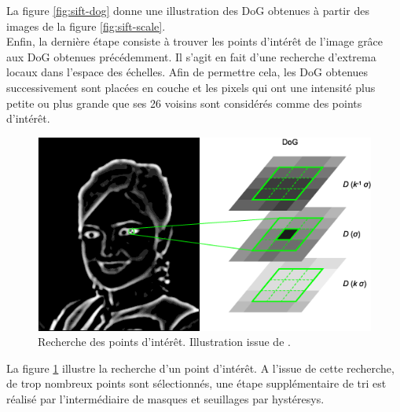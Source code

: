 \documentclass[a4paper, 11pt]{article}
\begin{document}
		La figure \ref{fig:sift-dog} donne une illustration des DoG obtenues à partir des images de la figure \ref{fig:sift-scale}.
		\\Enfin, la dernière étape consiste à trouver les points d'intérêt de l'image grâce aux DoG obtenues précédemment. Il s'agit en fait d'une recherche d'extrema locaux dans l'espace des échelles. Afin de permettre cela, les DoG obtenues successivement sont placées en couche et les pixels qui ont une intensité plus petite ou plus grande que ses 26 voisins sont considérés comme des points d'intérêt.
		\begin{figure}\centering
			\includegraphics[width=.6\textwidth]{SIFT-PoI.png}
			\caption{\label{fig:sift-poi}Recherche des points d'intérêt. Illustration issue de \cite{frwiki:177813849}.}
		\end{figure}
		La figure \ref{fig:sift-poi} illustre la recherche d'un point d'intérêt. A l'issue de cette recherche, de trop nombreux points sont sélectionnés, une étape supplémentaire de tri est réalisé par l'intermédiaire de masques et seuillages par hystéresys.
\end{document}
